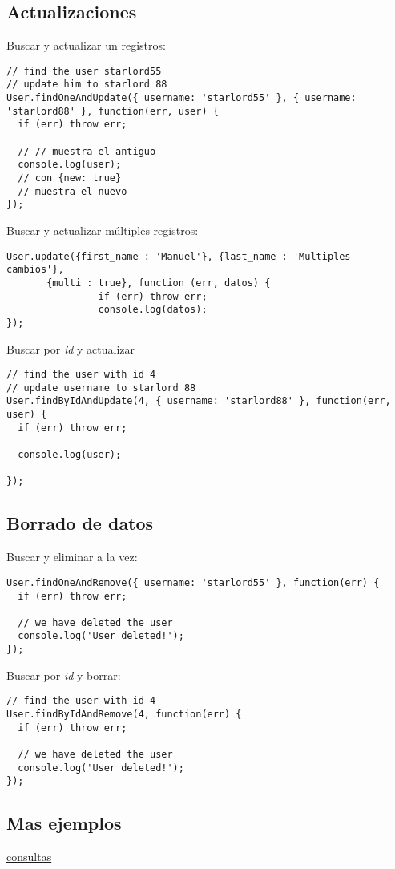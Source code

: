 \documentclass[4paper]{article}
\begin{document}
\subsection{Actualizaciones}
Buscar y actualizar un registros:
\begin{lstlisting}
// find the user starlord55
// update him to starlord 88
User.findOneAndUpdate({ username: 'starlord55' }, { username: 'starlord88' }, function(err, user) {
  if (err) throw err;

  // // muestra el antiguo
  console.log(user);
  // con {new: true}
  // muestra el nuevo
});
\end{lstlisting}

Buscar y actualizar múltiples registros:
\begin{lstlisting}
User.update({first_name : 'Manuel'}, {last_name : 'Multiples cambios'}, 
       {multi : true}, function (err, datos) {
                if (err) throw err;
                console.log(datos);
});
\end{lstlisting}

Buscar por \emph{id} y actualizar
\begin{lstlisting}
// find the user with id 4
// update username to starlord 88
User.findByIdAndUpdate(4, { username: 'starlord88' }, function(err, user) {
  if (err) throw err;

  console.log(user);
  
});
\end{lstlisting}


\subsection{Borrado de datos}
Buscar y eliminar a la vez:
\begin{lstlisting}
User.findOneAndRemove({ username: 'starlord55' }, function(err) {
  if (err) throw err;

  // we have deleted the user
  console.log('User deleted!');
});
\end{lstlisting}

Buscar por \emph{id} y borrar:
\begin{lstlisting}
// find the user with id 4
User.findByIdAndRemove(4, function(err) {
  if (err) throw err;

  // we have deleted the user
  console.log('User deleted!');
});
\end{lstlisting}

\subsection{Mas ejemplos}
\href{http://mongoosejs.com/docs/queries.html}{consultas}
\end{document}
